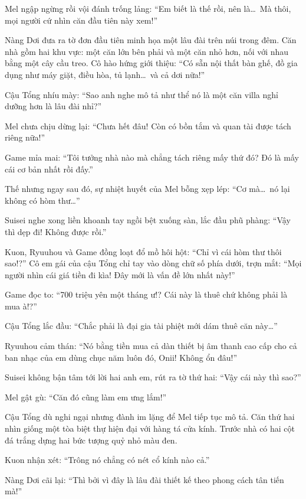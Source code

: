 \documentclass[../main.tex]{subfiles}
\begin{document}
Mel ngập ngừng rồi vội đánh trống lảng: ``Em biết là thế rồi, nên là\dots\ Mà thôi, mọi người cứ nhìn căn đầu tiên này xem!''

Nàng Dơi đưa ra tờ đơn đầu tiên minh họa một lâu đài trên núi trong đêm. Căn nhà gồm hai khu vực: một căn lớn bên phải và một căn nhỏ hơn, nối với nhau bằng một cây cầu treo. Cô hào hứng giới thiệu: ``Có sẵn nội thất bàn ghế, đồ gia dụng như máy giặt, điều hòa, tủ lạnh\dots\ và cả dơi nữa!''


Cậu Tổng nhíu mày: ``Sao anh nghe mô tả như thể nó là một căn villa nghỉ dưỡng hơn là lâu đài nhỉ?''

Mel chưa chịu dừng lại: ``Chưa hết đâu! Còn có bồn tắm và quan tài được tách riêng nữa!''

Game mỉa mai: ``Tôi tưởng nhà nào mà chẳng tách riêng mấy thứ đó? Đó là mấy cái cơ bản nhất rồi đấy.''

Thế nhưng ngay sau đó, sự nhiệt huyết của Mel bỗng xẹp lép: ``Cơ mà\dots\ nó lại không có hòm thư\dots''

Suisei nghe xong liền khoanh tay ngồi bệt xuống sàn, lắc đầu phũ phàng: ``Vậy thì dẹp đi! Không được rồi.''

Kuon, Ryuuhou và Game đồng loạt đổ mồ hôi hột: ``Chỉ vì cái hòm thư thôi sao!?'' Cô em gái của cậu Tổng chỉ tay vào dòng chữ số phía dưới, trợn mắt: ``Mọi người nhìn cái giá tiền đi kìa! Đây mới là vấn đề lớn nhất này!''

Game đọc to: ``700 triệu yên một tháng ư!? Cái này là thuê chứ không phải là mua à!?''

Cậu Tổng lắc đầu: ``Chắc phải là đại gia tài phiệt mới dám thuê căn này\dots''

Ryuuhou cảm thán: ``Nó bằng tiền mua cả dàn thiết bị âm thanh cao cấp cho cả ban nhạc của em dùng chục năm luôn đó, Onii! Không ổn đâu!''

Suisei không bận tâm tới lời hai anh em, rút ra tờ thứ hai: ``Vậy cái này thì sao?''

Mel gật gù: ``Căn đó cũng làm em ưng lắm!''

Cậu Tổng dù nghi ngại nhưng đành im lặng để Mel tiếp tục mô tả. Căn thứ hai nhìn giống một tòa biệt thự hiện đại với hàng tá cửa kính. Trước nhà có hai cột đá trắng dựng hai bức tượng quỷ nhỏ màu đen.


Kuon nhận xét: ``Trông nó chẳng có nét cổ kính nào cả.''

Nàng Dơi cãi lại: ``Thì bởi vì đây là lâu đài thiết kế theo phong cách tân tiến mà!''
\end{document}
